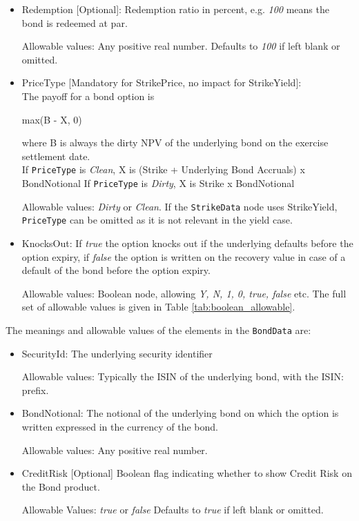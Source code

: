 \begin{itemize}
  \item Redemption [Optional]: Redemption ratio in percent, e.g. \emph{100} means the bond is redeemed at par.
  
      Allowable values:  Any positive real number. Defaults to \emph{100} if left blank or omitted.
  
    \item PriceType [Mandatory for StrikePrice, no impact for StrikeYield]: \\
    The payoff for a bond option is
  
	max(B - X, 0) 

    where B is always the dirty NPV of the underlying bond on the exercise settlement date. \\
    If \lstinline!PriceType!  is \emph{Clean}, X is  (Strike + Underlying Bond Accruals) x BondNotional 
    If \lstinline!PriceType!  is \emph{Dirty}, X is Strike x BondNotional 
    
    Allowable values: \emph{Dirty} or \emph{Clean}. If the \lstinline!StrikeData! node uses StrikeYield, \lstinline!PriceType! can be omitted as it is not relevant in the yield case.
  \item KnocksOut: If \emph{true} the option knocks out if the underlying defaults before the option expiry, if \emph{false} the
    option is written on the recovery value in case of a default of the bond before the option expiry.
    
Allowable values: Boolean node, allowing \emph{Y, N, 1, 0, true, false} etc. The full set of allowable values is given in Table \ref{tab:boolean_allowable}.    
    
\end{itemize}

The meanings and allowable values of the elements in the \lstinline!BondData! are:

\begin{itemize}
  \item SecurityId: The underlying security identifier

      Allowable values:  Typically the ISIN of the underlying bond, with the ISIN: prefix. 
  \item BondNotional: The notional of the underlying bond on which the option is written expressed in the currency of the bond.

      Allowable values:  Any positive real number.
    \item CreditRisk [Optional] Boolean flag indicating whether to show Credit Risk on the Bond product.
    
      Allowable Values: \emph{true} or \emph{false} Defaults to \emph{true} if left blank or omitted.          
\end{itemize}
